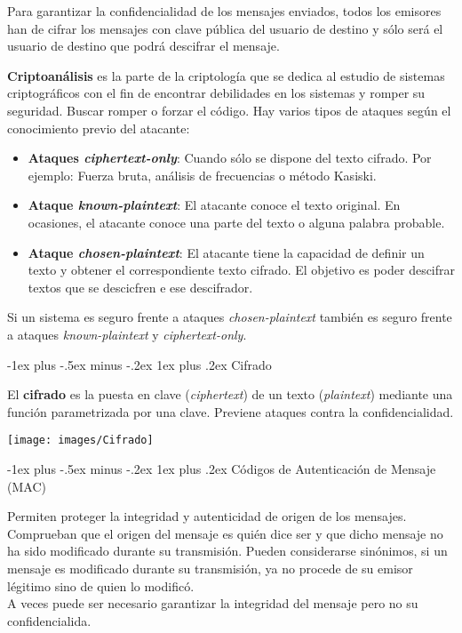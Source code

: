 \documentclass[10pt,portrait, twocolumn]{article}
\makeatletter
\renewcommand{\subsubsection}{\@startsection{subsubsection}{3}{0mm}%
                                {-1ex plus -.5ex minus -.2ex}%
                                {1ex plus .2ex}%
                                {\normalfont\small\bfseries}}
\makeatother
\begin{document}
Para garantizar la confidencialidad de los mensajes enviados, todos los emisores han de cifrar los mensajes con clave pública del usuario de destino y sólo será el usuario de destino que podrá descifrar el mensaje.
	
\textbf{Criptoanálisis} es la parte de la criptología que se dedica al estudio de sistemas criptográficos con el fin de encontrar debilidades en los sistemas y romper su seguridad. Buscar romper o forzar el código. Hay varios tipos de ataques según el conocimiento previo del atacante:

	\begin{itemize}
		\item \textbf{Ataques \textit{ciphertext-only}}: Cuando sólo se dispone del texto cifrado. Por ejemplo: Fuerza bruta, análisis de frecuencias o método Kasiski.
		\item \textbf{Ataque \textit{known-plaintext}}: El atacante conoce el texto original. En ocasiones, el atacante conoce una parte del texto o alguna palabra probable.
		\item \textbf{Ataque \textit{chosen-plaintext}}: El atacante tiene la capacidad de definir un texto y obtener el correspondiente texto cifrado. El objetivo es poder descifrar textos que se descicfren e ese descifrador.
	\end{itemize}
	
Si un sistema es seguro frente a ataques \textit{chosen-plaintext} también es seguro frente a ataques \textit{known-plaintext} y \textit{ciphertext-only}.	
	
	\subsubsection{Cifrado}
	
El \textbf{cifrado} es la puesta en clave (\textit{ciphertext}) de un texto (\textit{plaintext}) mediante una función parametrizada por una clave. Previene ataques contra la confidencialidad.

	\begin{center}
		\texttt{[image: images/Cifrado]}
	\end{center}

	
	
	\subsubsection{Códigos de Autenticación de Mensaje (MAC)}

	Permiten proteger la integridad y autenticidad de origen de los mensajes. Comprueban que el origen del mensaje es quién dice ser y que dicho mensaje no ha sido modificado durante su transmisión. Pueden considerarse sinónimos, si un mensaje es modificado durante su transmisión, ya no procede de su emisor légitimo sino de quien lo modificó.\\
\quad A veces puede ser necesario garantizar la integridad del mensaje pero no su confidencialida.\\
\end{document}
